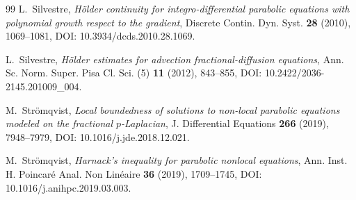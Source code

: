 \documentclass[10pt]{amsart}
\theoremstyle{plain}
\theoremstyle{definition}
\theoremstyle{remark}
\numberwithin{equation}{section}
\begin{document}
\begin{thebibliography}{99}
L.~Silvestre,
\emph{H\"older continuity for integro-differential parabolic equations
with polynomial growth respect to the gradient},
Discrete Contin. Dyn. Syst. \textbf{28} (2010), 1069--1081,
DOI: 10.3934/dcds.2010.28.1069.

L.~Silvestre,
\emph{H\"older estimates for advection fractional-diffusion equations},
Ann. Sc. Norm. Super. Pisa Cl. Sci. (5) \textbf{11} (2012), 843--855,
DOI: 10.2422/2036-2145.201009\_004.

M.~Str\"omqvist,
\emph{Local boundedness of solutions to non-local parabolic equations
modeled on the fractional $p$-Laplacian},
J. Differential Equations \textbf{266} (2019), 7948--7979,
DOI: 10.1016/j.jde.2018.12.021.

M.~Str\"omqvist,
\emph{Harnack's inequality for parabolic nonlocal equations},
Ann. Inst. H. Poincar\'e Anal. Non Lin\'eaire \textbf{36} (2019),
1709--1745,
DOI: 10.1016/j.anihpc.2019.03.003.

\end{thebibliography}
\end{document}
